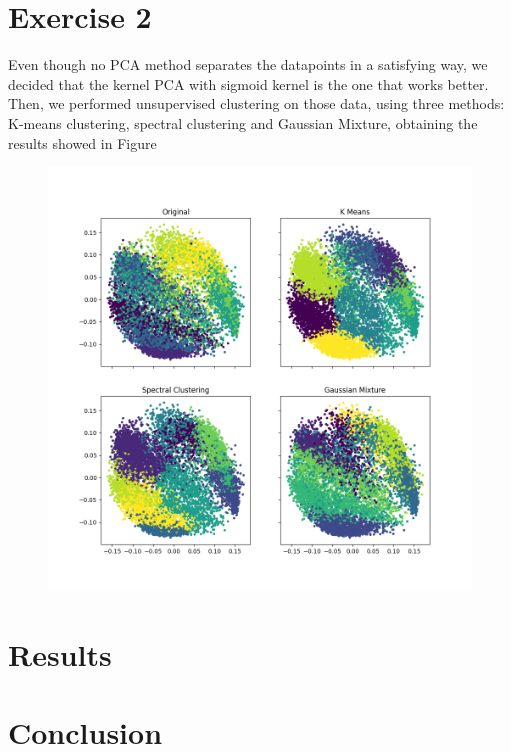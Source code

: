 \documentclass[12pt]{article}
\begin{document}
\section{Exercise 2}
Even though no PCA method separates the datapoints in a satisfying way, we decided that the kernel PCA with sigmoid kernel is the one that works better. Then, we performed unsupervised clustering on those data, using three methods: K-means clustering, spectral clustering and Gaussian Mixture, obtaining the results showed in Figure

\begin{figure}[h]
	\includegraphics[width = 1 \textwidth]{unsupervised_clustering.png}
	\caption{}
	\label{fig:unsupervised_clustering}
\end{figure}



\section{Results}

\section{Conclusion}

% 
% 
\end{document}
